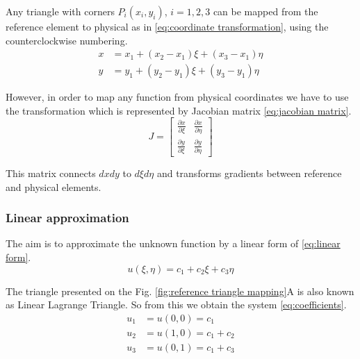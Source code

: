 \documentclass[acmsmall,screen]{MapleTrans}
\begin{document}
Any triangle with corners $P_i(x_i, y_i)$, $i = 1, 2, 3$ can be mapped from the reference element to physical as in \eqref{eq:coordinate transformation}, using the counterclockwise numbering.
\begin{equation}
\begin{aligned}
    x &= x_1 + (x_2 - x_1)\xi + (x_3 - x_1)\eta \\
    y &= y_1 + (y_2 - y_1)\xi + (y_3 - y_1)\eta
    \label{eq:coordinate transformation}
\end{aligned}
\end{equation}

However, in order to map any function from physical coordinates we have to use the transformation which is represented by Jacobian matrix \eqref{eq:jacobian matrix}.
\begin{equation}
    J = \begin{bmatrix}
        \frac{\partial x}{\partial \xi} & \frac{\partial x}{\partial \eta} \\
        \frac{\partial y}{\partial \xi} & \frac{\partial y}{\partial \eta} 
    \end{bmatrix}
    \label{eq:jacobian matrix}
\end{equation}

This matrix connects $dxdy$ to $d\xi d\eta$ and transforms gradients between reference and physical elements.


\subsubsection{Linear approximation} \label{sub:linear approximation}
The aim is to approximate the unknown function by a linear form of \eqref{eq:linear form}. 
\begin{equation}
    u(\xi, \eta) = c_1 + c_2\xi + c_3\eta
    \label{eq:linear form}
\end{equation}

The triangle presented on the Fig. \ref{fig:reference triangle mapping}A is also known as Linear Lagrange Triangle.
So from this we obtain the system \eqref{eq:coefficients}.
\begin{equation}
\begin{aligned}
    u_1 &= u(0, 0) = c_1 \\
    u_2 &= u(1, 0) = c_1 + c_2 \\
    u_3 &= u(0, 1) = c_1 + c_3
    \label{eq:coefficients}
\end{aligned}
\end{equation}
\end{document}
